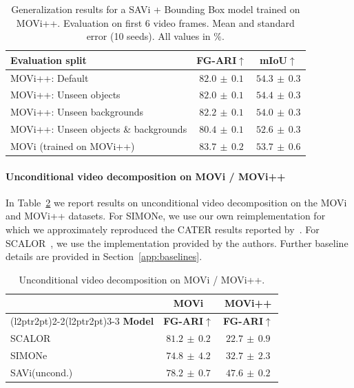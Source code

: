 \documentclass{article}
\newcommand{\modelname}{SAVi\xspace}
\begin{document}
\begin{table}[htp]
\centering
\caption{Generalization results for a SAVi + Bounding Box model trained on MOVi++. Evaluation on first 6 video frames. Mean and standard error (10 seeds). All values in $\%$.}
\vspace{-1em}
\begin{tabular}{lcc} \\%
\toprule
\textbf{Evaluation split} & \textbf{FG-ARI}$\uparrow$ & \textbf{mIoU}$\uparrow$ \\
\midrule
MOVi++: Default &   $82.0 \scriptstyle{\,\pm\,0.1}$ &  $54.3 \scriptstyle{\,\pm\,0.3}$ \\
MOVi++: Unseen objects &   $82.0 \scriptstyle{\,\pm\,0.1}$ &	$54.4 \scriptstyle{\,\pm\,0.3}$ \\
MOVi++: Unseen backgrounds &   $82.2 \scriptstyle{\,\pm\,0.1}$ &	$54.0 \scriptstyle{\,\pm\,0.3}$ \\
MOVi++: Unseen objects \& backgrounds &   $80.4 \scriptstyle{\,\pm\,0.1}$ &	$52.6 \scriptstyle{\,\pm\,0.3}$ \\
MOVi (trained on MOVi++) & $83.7 \scriptstyle{\,\pm\,0.2}$ & $53.7 \scriptstyle{\,\pm\,0.6}$ \\
\bottomrule
\end{tabular}
\label{table:generalization}
\end{table}


\paragraph{Unconditional video decomposition on MOVi / MOVi++}

In Table~\ref{table:movi_unconditional} we report results on unconditional video decomposition on the MOVi and MOVi++ datasets. For SIMONe, we use our own reimplementation for which we approximately reproduced the CATER results reported by~\citet{kabra2021simone}. For SCALOR~\citep{jiang2019scalable}, we use the implementation provided by the authors. Further baseline details are provided in Section~\ref{app:baselines}.

\begin{table}[htp]
\centering
\caption{Unconditional video decomposition on MOVi / MOVi++.}
\vspace{-1em}
\begin{tabular}{lcc} \\%
\toprule
 & MOVi & MOVi++ \\
\cmidrule(l{2pt}r{2pt}){2-2}\cmidrule(l{2pt}r{2pt}){3-3}
\textbf{Model}& \textbf{FG-ARI}$\uparrow$ &  \textbf{FG-ARI}$\uparrow$\\
\midrule
SCALOR & $81.2\scriptstyle{\,\pm\,0.2}$ & $22.7\scriptstyle{\,\pm\,0.9}$ \\
SIMONe & $74.8 \scriptstyle{\,\pm\,4.2}$ &  $32.7 \scriptstyle{\,\pm\,2.3}$\\
\modelname (uncond.) &  $78.2 \scriptstyle{\,\pm\,0.7}$ &  $47.6 \scriptstyle{\,\pm\,0.2}$ \\
\bottomrule
\end{tabular}
\label{table:movi_unconditional}
\end{table}
\end{document}
